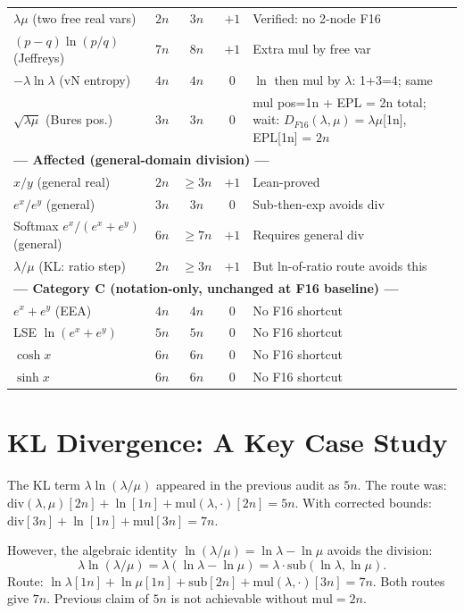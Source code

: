 \documentclass[11pt]{article}
\begin{document}
\begin{longtable}{p{4.5cm}cccp{4.5cm}}
$\lambda \mu$ (two free real vars) & $2n$ & $3n$ & $+1$ & Verified: no 2-node F16 \\
$(p-q)\ln(p/q)$ (Jeffreys) & $7n$ & $8n$ & $+1$ & Extra mul by free var \\
$-\lambda\ln\lambda$ (vN entropy) & $4n$ & $4n$ & $0$ & $\ln$ then mul by $\lambda$: 1+3=4; same \\
$\sqrt{\lambda\mu}$ (Bures pos.) & $3n$ & $3n$ & $0$ & mul pos=1n + EPL = 2n total; wait: $D_{F16}(\lambda,\mu)=\lambda\mu$[1n], EPL[1n] = $2n$ \\
\multicolumn{5}{l}{\textbf{--- Affected (general-domain division) ---}} \\
$x / y$ (general real) & $2n$ & $\geq 3n$ & $+1$ & Lean-proved \\
$e^x / e^y$ (general) & $3n$ & $3n$ & $0$ & Sub-then-exp avoids div \\
Softmax $e^x/(e^x+e^y)$ (general) & $6n$ & $\geq 7n$ & $+1$ & Requires general div \\
$\lambda/\mu$ (KL: ratio step) & $2n$ & $\geq 3n$ & $+1$ & But ln-of-ratio route avoids this \\
\multicolumn{5}{l}{\textbf{--- Category C (notation-only, unchanged at F16 baseline) ---}} \\
$e^x + e^y$ (EEA) & $4n$ & $4n$ & $0$ & No F16 shortcut \\
LSE $\ln(e^x+e^y)$ & $5n$ & $5n$ & $0$ & No F16 shortcut \\
$\cosh x$ & $6n$ & $6n$ & $0$ & No F16 shortcut \\
$\sinh x$ & $6n$ & $6n$ & $0$ & No F16 shortcut \\
\end{longtable}

\section{KL Divergence: A Key Case Study}

The KL term $\lambda \ln(\lambda/\mu)$ appeared in the previous audit as $5n$.
The route was: $\mathrm{div}(\lambda,\mu)[2n] + \ln[1n] + \mathrm{mul}(\lambda,\cdot)[2n] = 5n$.
With corrected bounds: $\mathrm{div}[3n] + \ln[1n] + \mathrm{mul}[3n] = 7n$.

However, the algebraic identity $\ln(\lambda/\mu) = \ln\lambda - \ln\mu$ avoids the division:
\[
\lambda\ln(\lambda/\mu) = \lambda(\ln\lambda - \ln\mu) = \lambda\cdot\mathrm{sub}(\ln\lambda,\ln\mu).
\]
Route: $\ln\lambda[1n] + \ln\mu[1n] + \mathrm{sub}[2n] + \mathrm{mul}(\lambda,\cdot)[3n] = 7n$.
Both routes give $7n$. Previous claim of $5n$ is not achievable without $\mathrm{mul}=2n$.
\end{document}
